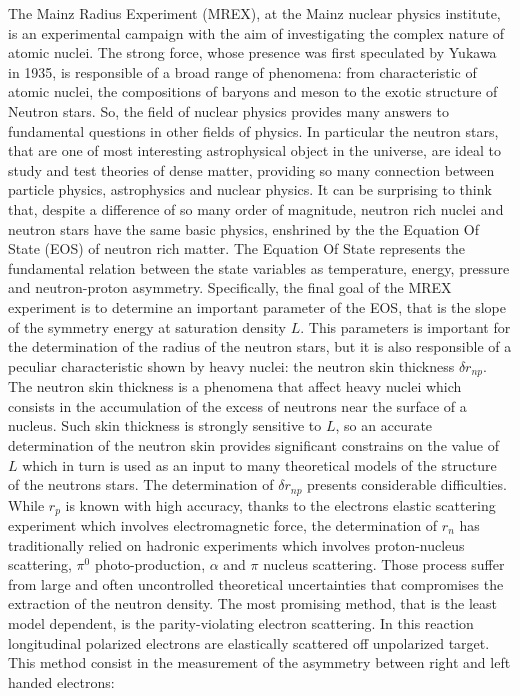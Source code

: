The Mainz Radius Experiment (MREX), at the Mainz nuclear physics institute, is an experimental campaign with the aim of investigating the complex nature of atomic nuclei. The strong force, whose presence was first speculated by Yukawa in 1935, is responsible of a broad range of phenomena: from characteristic of atomic nuclei, the compositions of baryons and meson to the exotic structure of Neutron stars. So, the field of nuclear physics provides many answers to fundamental questions in other fields of physics. In particular the neutron stars, that are one of most interesting astrophysical object in the universe, are ideal to study and test theories of dense matter, providing so many connection between particle physics, astrophysics and nuclear physics. It can be surprising to think that, despite a difference of so many order of magnitude, neutron rich nuclei and neutron stars have the same basic physics, enshrined by the the Equation Of State (EOS) of neutron rich matter. The Equation Of State represents the fundamental relation between the state variables as temperature, energy, pressure and neutron-proton asymmetry. Specifically, the final goal of the MREX experiment is to determine an important parameter of the EOS, that is the slope of the symmetry energy at saturation density $L$. This parameters is important for the determination of the radius of the neutron stars, but it is also responsible of a peculiar characteristic shown by heavy nuclei: the neutron skin thickness $\delta r_{np}$. The neutron skin thickness is a phenomena that affect heavy nuclei which consists in the accumulation of the excess of neutrons near the surface of a nucleus. Such skin thickness is strongly sensitive to $L$, so an accurate determination of the neutron skin provides significant constrains on the value of $L$ which in turn is used as an input to many theoretical models of the structure of the neutrons stars.
The determination of $\delta r_{np}$ presents considerable difficulties. While $r_{p}$ is known with high accuracy, thanks to the electrons elastic scattering experiment which involves electromagnetic force, the determination of $r_{n}$ has traditionally relied on hadronic experiments which involves proton-nucleus scattering, $\pi^{0}$ photo-production, $\alpha$ and $\pi$ nucleus scattering. Those process suffer from large and often uncontrolled theoretical uncertainties that compromises the extraction of the neutron density. The most promising method, that is the least model dependent, is the parity-violating electron scattering. In this reaction longitudinal polarized electrons are elastically scattered off unpolarized target. This method consist in the measurement of the asymmetry between right and left handed electrons:

